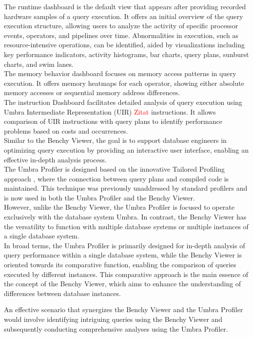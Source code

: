 \noindent 
The runtime dashboard is the default view that appears after providing recorded hardware samples of a query execution. It offers an initial overview of the query execution structure, allowing users to analyze the activity of specific processor events, operators, and pipelines over time. Abnormalities in execution, such as resource-intensive operations, can be identified, aided by visualizations including key performance indicators, activity histograms, bar charts, query plans, sunburst charts, and swim lanes.
\\The memory behavior dashboard focuses on memory access patterns in query execution. It offers memory heatmaps for each operator, showing either absolute memory accesses or sequential memory address differences.
\\The instruction Dashboard facilitates detailed analysis of query execution using Umbra Intermediate Representation (UIR) \textcolor{red}{Zitat} instructions. It allows comparison of UIR instructions with query plans to identify performance problems based on costs and occurrences. 
\\Similar to the Benchy Viewer, the goal is to support database engineers in optimizing query execution by providing an interactive user interface, enabling an effective in-depth analysis process. 
\\The Umbra Profiler is designed based on the innovative Tailored Profiling approach \cite{profiling-dataflow}, where the connection between query plans and compiled code is maintained. This technique was previously unaddressed by standard profilers and is now used in both the Umbra Profiler and the Benchy Viewer.  
\\However, unlike the Benchy Viewer, the Umbra Profiler is focused to operate exclusively with the database system Umbra. In contrast, the Benchy Viewer has the versatility to function with multiple database systems or multiple instances of a single database system.
\\In broad terms, the Umbra Profiler is primarily designed for in-depth analysis of query performance within a single database system, while the Benchy Viewer is oriented towards its comparative function, enabling the comparison of queries executed by different instances. This comparative approach is the main essence  of the concept of the Benchy Viewer, which aims to enhance the understanding of differences between database instances.

An effective scenario that synergizes the Benchy Viewer and the Umbra Profiler would involve identifying intriguing queries using the Benchy Viewer and subsequently conducting comprehensive analyses using the Umbra Profiler.


